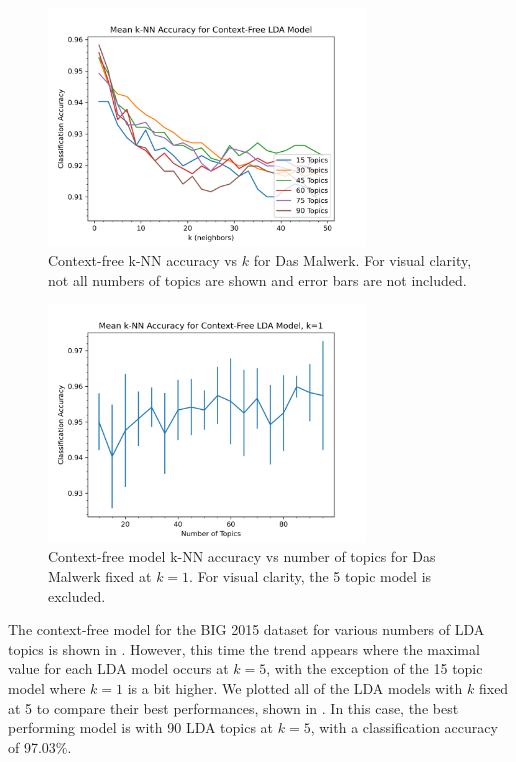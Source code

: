 \documentclass[../stegner_thesis.tex]{subfiles}
\begin{document}
\begin{figure}[p]
	\centering
	\includegraphics[width=0.75\textwidth]{img/win32/knn_lda.png}
	\caption[Context-free k-NN accuracy vs $k$ for Das Malwerk]{%
		Context-free k-NN accuracy vs $k$ for Das Malwerk.
		For visual clarity, not all numbers of topics are shown and error bars are
		not included.
	}%
	\label{fig:win32_knn_topics}
\end{figure}
\begin{figure}[p]
	\centering
	\includegraphics[width=0.75\textwidth]{img/win32/knn_lda_k_01.png}
	\caption[%
		Context-free model k-NN accuracy vs number of topics for Das Malwerk
	]{%
		Context-free model k-NN accuracy vs number of topics for Das Malwerk fixed
		at $k=1$.
		For visual clarity, the 5 topic model is excluded.
	}%
	\label{fig:win32_knn_k1}
\end{figure}

\par The context-free model for the BIG 2015 dataset for various numbers
of LDA topics is shown in .
However, this time the trend appears where the maximal value for each LDA model
occurs at $k=5$, with the exception of the 15 topic model where $k=1$ is a bit
higher.
We plotted all of the LDA models with $k$ fixed at 5 to compare their best
performances, shown in .
In this case, the best performing model is with 90 LDA topics at $k=5$, with a
classification accuracy of 97.03\%.
\end{document}

